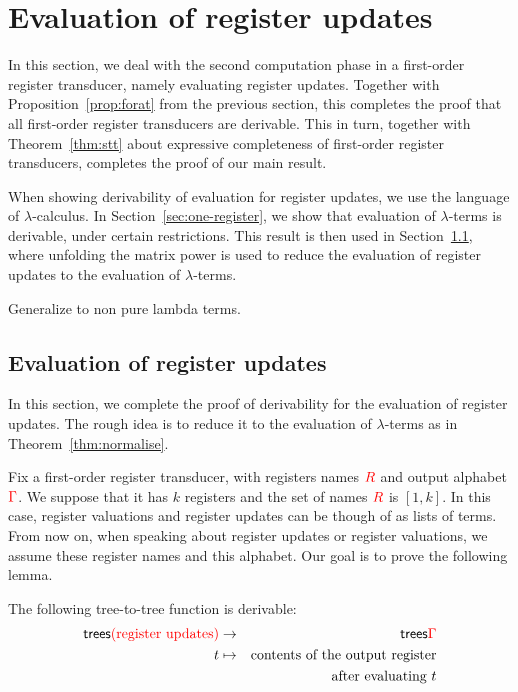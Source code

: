 
\section{Evaluation of register updates}
\label{sec:stt-derivable}
In this section, we deal with the second computation phase in a first-order register transducer, namely evaluating register updates. Together with Proposition~\ref{prop:forat} from the previous section, this completes the proof that all first-order register transducers are derivable. This in turn, together with Theorem~\ref{thm:stt} about expressive completeness of first-order register transducers, completes the proof of our main result. 


When showing derivability of  evaluation for register updates, we  use the language of $\lambda$-calculus.  In Section~\ref{sec:one-register},  we show that evaluation of $\lambda$-terms is derivable, under certain restrictions. This result is then used in Section~\ref{sec:updates-endgame}, where unfolding the matrix power is used to reduce the evaluation of register updates to the evaluation of $\lambda$-terms.  


%
Generalize to non pure lambda terms.

\subsection{Evaluation of register updates}
\label{sec:updates-endgame}
In this section, we complete the proof of derivability for the evaluation of register updates. The rough idea is to reduce it to the evaluation of $\lambda$-terms as in Theorem~\ref{thm:normalise}. %

Fix a first-order register transducer, with registers names ${{\color{red}{R}}}$ and output alphabet ${\color{red}{\Gamma}}$. We suppose that it has $k$ registers and the set of names ${{\color{red}{R}}}$ is $[1,k]$. In this case, register valuations and register updates can be though of as lists of terms. 
From now on, when speaking about register updates or register valuations, we assume these register names and this alphabet. Our goal is to prove the following lemma. 
\begin{lemma}\label{lem:derive-register-updates}
    The  following tree-to-tree function  is derivable:
    \begin{eqnarray*}
    \mathsf {trees}{{\color{red}{\text{(register updates)}}}} &\to & \mathsf {trees} {\color{red}{\Gamma}} \\
    t & \mapsto & \text{contents of the output register}\\
    && \text{after evaluating $t$}
    \end{eqnarray*}    
\end{lemma}

